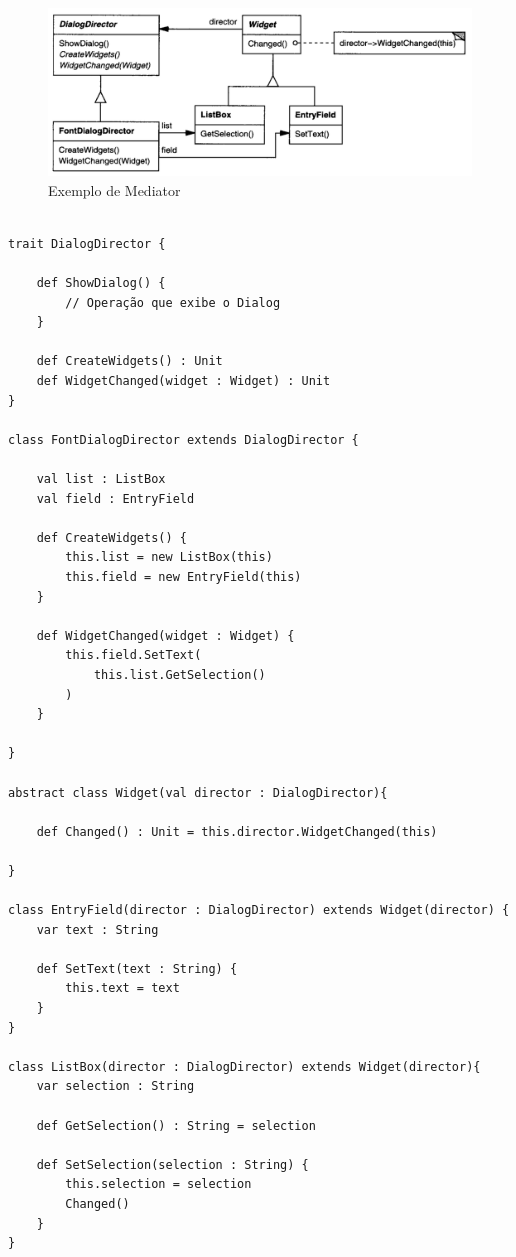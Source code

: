 \begin{figure}[htb]
	\caption{\label{mediator_exemplo}Exemplo de Mediator}
	\begin{center}
	    \includegraphics[scale=0.4]{5_padroes-contexto-funcional/5.3_comportamentais/5.3.05_mediator/exemplo_mediator.png}
	\end{center}
\end{figure}

\begin{lstlisting}[caption={Mediator Orientado a Objetos},label=oomediator]

trait DialogDirector {
    
    def ShowDialog() {
        // Operação que exibe o Dialog
    }

    def CreateWidgets() : Unit
    def WidgetChanged(widget : Widget) : Unit
}

class FontDialogDirector extends DialogDirector {
    
    val list : ListBox
    val field : EntryField
    
    def CreateWidgets() {
        this.list = new ListBox(this)
        this.field = new EntryField(this)
    }

    def WidgetChanged(widget : Widget) {
        this.field.SetText(
            this.list.GetSelection()
        )
    }

}

abstract class Widget(val director : DialogDirector){

    def Changed() : Unit = this.director.WidgetChanged(this)

}

class EntryField(director : DialogDirector) extends Widget(director) {
    var text : String

    def SetText(text : String) {
        this.text = text
    }
}

class ListBox(director : DialogDirector) extends Widget(director){
    var selection : String

    def GetSelection() : String = selection

    def SetSelection(selection : String) {
        this.selection = selection
        Changed()
    }
}
    
\end{lstlisting}

